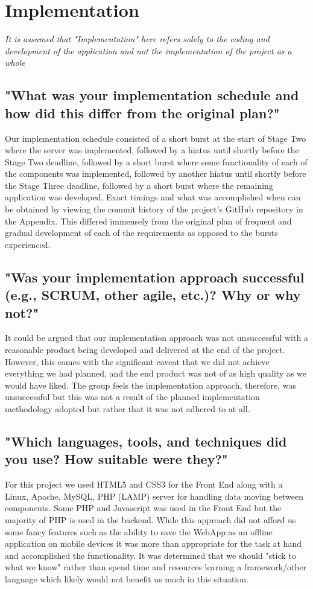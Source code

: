 \documentclass[11pt, oneside, a4paper]{report}   %
\begin{document}
\section{Implementation}
\textit{It is assumed that "Implementation" here refers solely to the coding and development of the application and not the implementation of the project as a whole}
\subsection{"What was your implementation schedule and how did this differ from the original plan?"} \label{sec:Implementation - 1}
Our implementation schedule consisted of a short burst at the start of Stage Two where the server was implemented, followed by a hiatus until shortly before the Stage Two deadline, followed by a short burst where some 
functionality of each of the components was implemented, followed by another hiatus until shortly before the Stage Three deadline, followed by a short burst where the remaining application was developed. Exact timings 
and what was accomplished when can be obtained by viewing the commit history of the project's GitHub repository in the Appendix. This differed immensely from the original plan of frequent and gradual development of
each of the requirements as opposed to the bursts experienced. 
\subsection{"Was your implementation approach successful (e.g., SCRUM, other agile, etc.)? Why or why
not?"} \label{sec:Implementation - 2}
It could be argued that our implementation approach was not unsuccessful with a reasonable product being developed and delivered at the end of the project. However, this comes with the significant caveat that we did not 
achieve everything we had planned, and the end product was not of as high quality as we would have liked. The group feels the implementation approach, therefore, was unsuccessful but this was not a result of the planned 
implementation methodology adopted but rather that it was not adhered to at all.  
\subsection{"Which languages, tools, and techniques did you use? How suitable were they?"} \label{sec:Implementation - 3}
For this project we used HTML5 and CSS3 for the Front End along with a Linux, Apache, MySQL, PHP (LAMP) server for handling data moving between components. Some PHP and Javascript was used in the Front End but the majority of PHP is used in the backend. While this approach did not afford us some fancy features such as the ability to save the WebApp as an offline application on mobile devices it was more than appropriate for the task at hand and accomplished the functionality. It was determined that we should "stick to what we know" rather than spend time and resources learning a framework/other language which likely would not benefit us much in this situation.
\pagebreak
\end{document}
